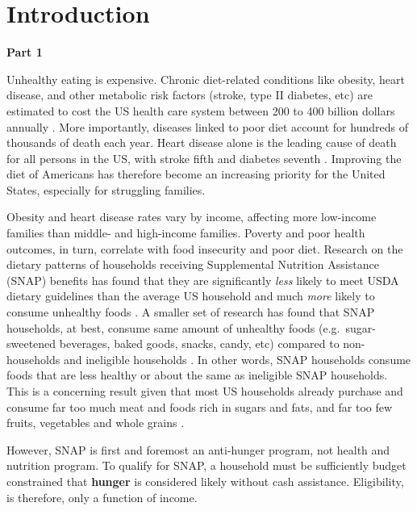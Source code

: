 \documentclass[12pt,letterpaperpaper,]{book}
\begin{document}
\section*{Introduction}\label{intro-1}

\textbf{Part 1}

Unhealthy eating is expensive. Chronic diet-related conditions like
obesity, heart disease, and other metabolic risk factors (stroke, type
II diabetes, etc) are estimated to cost the US health care system
between 200 to 400 billion dollars annually
\citep{cawley_medical_2012, chatterjee_checkup_2014}. More importantly,
diseases linked to poor diet account for hundreds of thousands of death
each year. Heart disease alone is the leading cause of death for all
persons in the US, with stroke fifth and diabetes seventh
\citep{national_center_for_health_statistics_health_2015}. Improving the
diet of Americans has therefore become an increasing priority for the
United States, especially for struggling families.

Obesity and heart disease rates vary by income, affecting more
low-income families than middle- and high-income families. Poverty and
poor health outcomes, in turn, correlate with food insecurity and poor
diet. Research on the dietary patterns of households receiving
Supplemental Nutrition Assistance (SNAP) benefits has found that they
are significantly \emph{less} likely to meet USDA dietary guidelines
than the average US household and much \emph{more} likely to consume
unhealthy foods
\citep{andreyeva_dietary_2015, nguyen_supplemental_2015, wolfson_fruit_2015}.
A smaller set of research has found that SNAP households, at best,
consume same amount of unhealthy foods (e.g.~sugar-sweetened beverages,
baked goods, snacks, candy, etc) compared to non-households and
ineligible households \citep{todd_caloric_2014, hoynes_snap_2014}. In
other words, SNAP households consume foods that are less healthy or
about the same as ineligible SNAP households. This is a concerning
result given that most US households already purchase and consume far
too much meat and foods rich in sugars and fats, and far too few fruits,
vegetables and whole grains
\citep{usda_scientific_2015, frazao_high_1999}.

However, SNAP is first and foremost an anti-hunger program, not health
and nutrition program. To qualify for SNAP, a household must be
sufficiently budget constrained that \textbf{hunger} is considered
likely without cash assistance. Eligibility, is therefore, only a
function of income.
\end{document}
